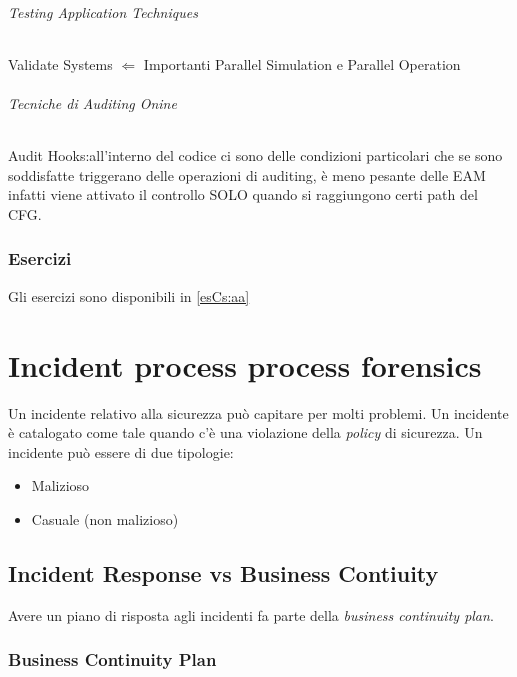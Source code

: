 \paragraph{Testing Application Techniques}
Validate Systems $\Leftarrow$ Importanti Parallel Simulation e Parallel
Operation



\paragraph{Tecniche di Auditing Onine}
Audit Hooks:all'interno del codice ci sono delle condizioni particolari che se
sono soddisfatte triggerano delle operazioni di auditing, è meno pesante delle
EAM infatti viene attivato il controllo SOLO quando si raggiungono certi path
del CFG.

\section{Esercizi}

Gli esercizi sono disponibili in \ref{esCs:aa}

\part{Incident process process forensics}

Un incidente relativo alla sicurezza può capitare per molti problemi. Un
incidente è catalogato come tale quando c'è una violazione della \textit{policy}
di sicurezza. Un incidente può essere di due tipologie:
\begin{itemize}
\item Malizioso
\item Casuale (non malizioso)
\end{itemize}

\chapter{Incident Response vs Business Contiuity}
\label{IRBC}

Avere un piano di risposta agli incidenti fa parte della \textit{business
continuity plan}.

\section{Business Continuity Plan}

